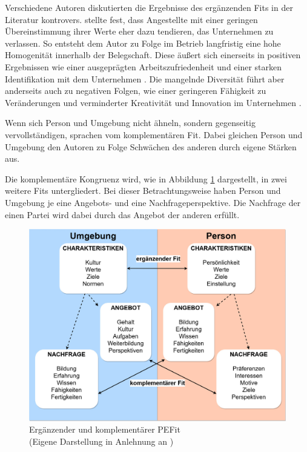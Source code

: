 Verschiedene Autoren diskutierten die Ergebnisse des ergänzenden Fits in der Literatur kontrovers. \textcite[S. 6]{schneider:1987} stellte fest, dass Angestellte mit einer geringen Übereinstimmung ihrer Werte eher dazu tendieren, das Unternehmen zu verlassen. So entsteht dem Autor zu Folge im Betrieb langfristig eine hohe Homogenität innerhalb der Belegschaft. Diese äußert sich einerseits in positiven Ergebnissen wie einer ausgeprägten Arbeitszufriedenheit und einer starken Identifikation mit dem Unternehmen \cite[S. 26]{kristof:1996}. Die mangelnde Diversität führt aber anderseits auch zu negativen Folgen, wie einer geringeren Fähigkeit zu Veränderungen \cite[S. 10]{schneider:1987} und verminderter Kreativität \cite[S. 7]{chatman:1998} und Innovation im Unternehmen \cite[S. 11]{chatman:1989}.

Wenn sich Person und Umgebung nicht ähneln, sondern gegenseitig vervollständigen, sprachen \textcite[S. 4]{muchinsky:1987} vom komplementären Fit. Dabei gleichen Person und Umgebung den Autoren zu Folge Schwächen des anderen durch eigene Stärken aus.

Die komplementäre Kongruenz wird, wie in Abbildung \ref{fig:personEnvironmentFit:supplementaryUndComplementary:abb1} dargestellt, in zwei weitere Fits untergliedert. Bei dieser Betrachtungsweise haben Person und Umgebung je eine Angebots- und eine Nachfrageperspektive. Die Nachfrage der einen Partei wird dabei durch das Angebot der anderen erfüllt. \cite[S. 2ff.]{caplan:1987}\cite[S. 2ff.]{edwards:1991}\cite[S. 2]{copingAndAdaption:1974}\cite[S. 3f.]{kristof:1996}

\begin{figure}[h]
	\centering
	\includegraphics[width=1\textwidth]{gfx/supplementaryComplementaryFit.jpg}
	\caption[Ergänzender und komplementärer \acs{PEFit}]{Ergänzender und komplementärer \acs{PEFit}\\
	(Eigene Darstellung in Anlehnung an \cite[S. 4]{kristof:1996})}
	\label{fig:personEnvironmentFit:supplementaryUndComplementary:abb1}
\end{figure}

